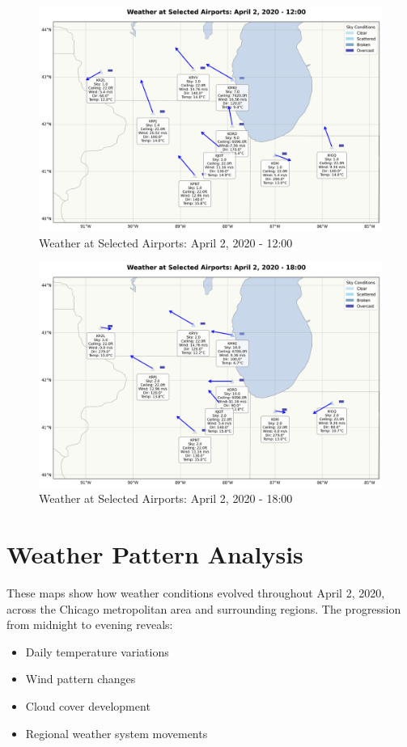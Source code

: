 \documentclass{article}
\begin{document}
\begin{figure}[H]
    \centering
    \includegraphics[width=\textwidth]{weather_map_12_00.png}
    \caption{Weather at Selected Airports: April 2, 2020 - 12:00}
    \label{fig:weather_12_00}
\end{figure}

\begin{figure}[H]
    \centering
    \includegraphics[width=\textwidth]{weather_map_18_00.png}
    \caption{Weather at Selected Airports: April 2, 2020 - 18:00}
    \label{fig:weather_18_00}
\end{figure}

\section{Weather Pattern Analysis}
These maps show how weather conditions evolved throughout April 2, 2020, across the Chicago metropolitan area and surrounding regions. The progression from midnight to evening reveals:
\begin{itemize}
    \item Daily temperature variations
    \item Wind pattern changes
    \item Cloud cover development
    \item Regional weather system movements
\end{itemize}
\end{document}
